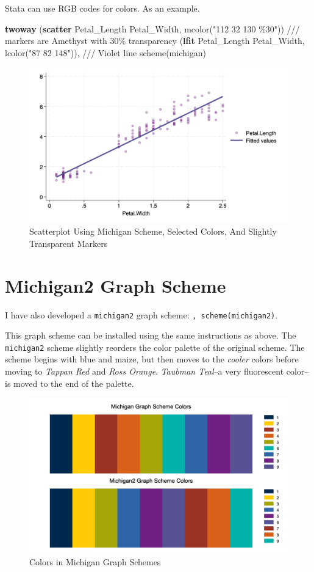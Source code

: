 \documentclass[
  letterpaper,
  DIV=11,
  numbers=noendperiod]{scrartcl}
\newenvironment{Shaded}{\begin{snugshade}}{\end{snugshade}}
\newcommand{\CommentTok}[1]{\textcolor[rgb]{0.37,0.37,0.37}{#1}}
\newcommand{\DecValTok}[1]{\textcolor[rgb]{0.68,0.00,0.00}{#1}}
\newcommand{\KeywordTok}[1]{\textcolor[rgb]{0.00,0.23,0.31}{\textbf{#1}}}
\newcommand{\NormalTok}[1]{\textcolor[rgb]{0.00,0.23,0.31}{#1}}
\newcommand{\StringTok}[1]{\textcolor[rgb]{0.13,0.47,0.30}{#1}}
\begin{document}
Stata can use RGB codes for colors. As an example.

\begin{Shaded}
\begin{Highlighting}[]
\KeywordTok{twoway}\NormalTok{ (}\KeywordTok{scatter}\NormalTok{ Petal\_Length Petal\_Width, mcolor(}\StringTok{"112 32 130 \%30"}\NormalTok{)) }\CommentTok{/// markers are Amethyst with 30\% transparency}
\NormalTok{(}\KeywordTok{lfit}\NormalTok{ Petal\_Length Petal\_Width, lcolor(}\StringTok{"87 82 148"}\NormalTok{)), }\CommentTok{/// Violet line}
\DecValTok{scheme}\NormalTok{(michigan)}
\end{Highlighting}
\end{Shaded}

\begin{figure}[H]

{\centering \includegraphics[width=0.5\linewidth,height=\textheight,keepaspectratio]{myscatter3.png}

}

\caption{Scatterplot Using Michigan Scheme, Selected Colors, And
Slightly Transparent Markers}

\end{figure}%

\section{Michigan2 Graph Scheme}\label{michigan2-graph-scheme}

I have also developed a \texttt{michigan2} graph scheme:
\texttt{,\ scheme(michigan2)}.

This graph scheme can be installed using the same instructions as above.
The \texttt{michigan2} scheme slightly reorders the color palette of the
original scheme. The scheme begins with blue and maize, but then moves
to the \emph{cooler} colors before moving to \emph{Tappan Red} and
\emph{Ross Orange}. \emph{Taubman Teal}--a very fluorescent color--is
moved to the end of the palette.

\begin{figure}[H]

{\centering \includegraphics[width=0.5\linewidth,height=\textheight,keepaspectratio]{MichiganColorsStata3.png}

}

\caption{Colors in Michigan Graph Schemes}

\end{figure}%
\end{document}
